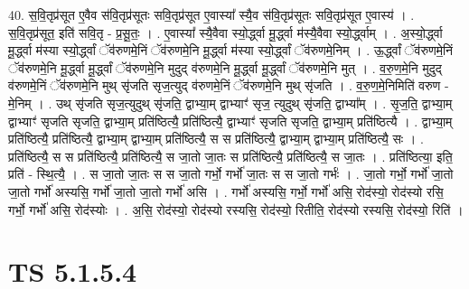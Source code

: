 \documentclass[17pt]{extarticle}
\begin{document}
40. स॒वि॒तृप्र॑सूत ए॒वैव स॑वि॒तृप्र॑सूतः सवि॒तृप्र॑सूत ए॒वास्या᳚ स्यै॒व स॑वि॒तृप्र॑सूतः सवि॒तृप्र॑सूत ए॒वास्य॑ । . स॒वि॒तृप्र॑सूत॒ इति॑ सवि॒तृ - प्र॒सू॒तः॒ । . ए॒वास्या᳚ स्यै॒वैवा स्यो॒र्द्ध्वा मू॒र्द्ध्वा म॑स्यै॒वैवा स्यो॒र्द्ध्वाम् । . अ॒स्यो॒र्द्ध्वा मू॒र्द्ध्वा म॑स्या स्यो॒र्द्ध्वां ॅव॑रुणमे॒निं ॅव॑रुणमे॒नि मू॒र्द्ध्वा म॑स्या स्यो॒र्द्ध्वां ॅव॑रुणमे॒निम् । . ऊ॒र्द्ध्वां ॅव॑रुणमे॒निं ॅव॑रुणमे॒नि मू॒र्द्ध्वा मू॒र्द्ध्वां ॅव॑रुणमे॒नि मुदुद् व॑रुणमे॒नि मू॒र्द्ध्वा मू॒र्द्ध्वां ॅव॑रुणमे॒नि मुत् । . व॒रु॒ण॒मे॒नि मुदुद् व॑रुणमे॒निं ॅव॑रुणमे॒नि मुथ् सृ॑जति सृज॒त्युद् व॑रुणमे॒निं ॅव॑रुणमे॒नि मुथ् सृ॑जति । . व॒रु॒ण॒मे॒निमिति॑ वरुण - मे॒निम् । . उथ् सृ॑जति सृज॒त्युदुथ् सृ॑जति॒ द्वाभ्या॒म् द्वाभ्याꣳ॑ सृज॒ त्युदुथ् सृ॑जति॒ द्वाभ्या᳚म् । . सृ॒ज॒ति॒ द्वाभ्या॒म् द्वाभ्याꣳ॑ सृजति सृजति॒ द्वाभ्या॒म् प्रति॑ष्ठित्यै॒ प्रति॑ष्ठित्यै॒ द्वाभ्याꣳ॑ सृजति सृजति॒ द्वाभ्या॒म् प्रति॑ष्ठित्यै । . द्वाभ्या॒म् प्रति॑ष्ठित्यै॒ प्रति॑ष्ठित्यै॒ द्वाभ्या॒म् द्वाभ्या॒म् प्रति॑ष्ठित्यै॒ स स प्रति॑ष्ठित्यै॒ द्वाभ्या॒म् द्वाभ्या॒म् प्रति॑ष्ठित्यै॒ सः । . प्रति॑ष्ठित्यै॒ स स प्रति॑ष्ठित्यै॒ प्रति॑ष्ठित्यै॒ स जा॒तो जा॒तः स प्रति॑ष्ठित्यै॒ प्रति॑ष्ठित्यै॒ स जा॒तः । . प्रति॑ष्ठित्या॒ इति॒ प्रति॑ - स्थि॒त्यै॒ । . स जा॒तो जा॒तः स स जा॒तो गर्भो॒ गर्भो॑ जा॒तः स स जा॒तो गर्भः॑ । . जा॒तो गर्भो॒ गर्भो॑ जा॒तो जा॒तो गर्भो॑ अस्यसि॒ गर्भो॑ जा॒तो जा॒तो गर्भो॑ असि । . गर्भो॑ अस्यसि॒ गर्भो॒ गर्भो॑ असि॒ रोद॑स्यो॒ रोद॑स्यो रसि॒ गर्भो॒ गर्भो॑ असि॒ रोद॑स्योः । . अ॒सि॒ रोद॑स्यो॒ रोद॑स्यो रस्यसि॒ रोद॑स्यो॒ रितीति॒ रोद॑स्यो रस्यसि॒ रोद॑स्यो॒ रिति॑ । \newline
\pagebreak
{}

\section{ TS 5.1.5.4 }
\end{document}
